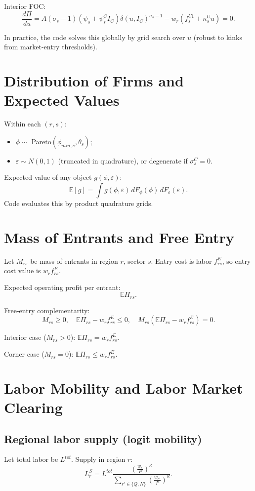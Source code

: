 \documentclass[11pt]{article}
\begin{document}
Interior FOC:
\begin{equation}
\frac{d\Pi}{du}
=
A(\sigma_s-1)(\psi_s+\psi^C_s I_C)\delta(u,I_C)^{\sigma_s-1}
-w_r(f^{U1}_s+\kappa^U_s u)
=0.
\label{eq:upgrade_foc}
\end{equation}

In practice, the code solves this globally by grid search over $u$ (robust to kinks from market-entry thresholds).

\section{Distribution of Firms and Expected Values}
Within each $(r,s)$:
\begin{itemize}
    \item $\phi\sim$ Pareto$(\phi_{min,s},\theta_s)$;
    \item $\varepsilon\sim N(0,1)$ (truncated in quadrature), or degenerate if $\sigma^C_s=0$.
\end{itemize}

Expected value of any object $g(\phi,\varepsilon)$:
\[
\mathbb E[g]=\int g(\phi,\varepsilon)\,dF_\phi(\phi)\,dF_\varepsilon(\varepsilon).
\]
Code evaluates this by product quadrature grids.

\section{Mass of Entrants and Free Entry}
Let $M_{rs}$ be mass of entrants in region $r$, sector $s$.
Entry cost is labor $f^E_{rs}$, so entry cost value is $w_r f^E_{rs}$.

Expected operating profit per entrant:
\[
\mathbb E\Pi_{rs}.
\]

Free-entry complementarity:
\begin{equation}
M_{rs}\ge 0,\quad
\mathbb E\Pi_{rs}-w_r f^E_{rs}\le 0,\quad
M_{rs}\left(\mathbb E\Pi_{rs}-w_r f^E_{rs}\right)=0.
\label{eq:free_entry_comp}
\end{equation}

Interior case ($M_{rs}>0$): $\mathbb E\Pi_{rs}=w_r f^E_{rs}$.

Corner case ($M_{rs}=0$): $\mathbb E\Pi_{rs}\le w_r f^E_{rs}$.

\section{Labor Mobility and Labor Market Clearing}
\subsection{Regional labor supply (logit mobility)}
Let total labor be $L^{tot}$.
Supply in region $r$:
\begin{equation}
L^S_r = L^{tot}
\frac{\left(\frac{w_r}{P}\right)^\kappa}
{\sum_{r'\in\{Q,N\}}\left(\frac{w_{r'}}{P}\right)^\kappa}.
\label{eq:labor_supply}
\end{equation}
\end{document}
